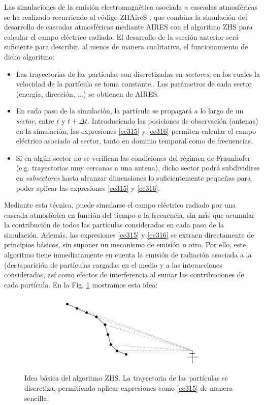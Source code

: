 \documentclass[12 pt, a4paper]{article} %
\numberwithin{equation}{section}
\numberwithin{figure}{section}
\numberwithin{table}{section}
\begin{document}
Las simulaciones de la emisión electromagnética asociada a cascadas atmosféricas se ha realizado recurriendo al código ZHAireS \cite{AlvarezMuniz2012}, que combina la simulación del desarrollo de cascadas atmosféricas mediante AIRES con el algoritmo ZHS para calcular el campo eléctrico radiado. El desarrollo de la sección anterior será suficiente para describir, al menos de manera cualitativa, el funcionamiento de dicho algoritmo:
	\begin{itemize}
		\item Las trayectorias de las partículas son discretizadas en \textit{sectores}, en los cuales la velocidad de la partícula se toma constante.. Los parámetros de cada sector (energía, dirección, ...) se obtienen de AIRES.
		\item En cada paso de la simulación, la partícula se propagará a lo largo de un \textit{sector}, entre $t$ y $t+\Delta t$. Introduciendo las posiciones de observación (antenas) en la simulación, las expresiones \eqref{ec315} y \eqref{ec316} permiten calcular el campo eléctrico asociado al sector, tanto en dominio temporal como de frecuencias.
		\item Si en algún sector no se verifican las condiciones del régimen de Fraunhofer (e.g. trayectorias muy cercanas a una antena), dicho sector podrá subdividirse en \textit{subsectores} hasta alcanzar dimensiones lo suficientemente pequeñas para poder aplicar las expresiones \eqref{ec315} y \eqref{ec316}.

		
	\end{itemize}
Mediante esta técnica, puede simularse el campo eléctrico radiado por una cascada atmosférica en función del tiempo o la frecuencia, sin más que acumular la contribución de todos las partículas consideradas en cada paso de la simulación. Además, las expresiones \eqref{ec315} y \eqref{ec316} se extraen directamente de principios básicos, sin suponer un mecanismo de emisión u otro. Por ello, este algoritmo tiene inmediatamente en cuenta la emisión de radiación asociada a la (des)aparición de partículas cargadas en el medio y a las interacciones consideradas, así como efectos de interferencia al sumar las contribuciones de cada partícula. En la Fig. \ref{ZHSsketch} mostramos esta idea:  
	\begin{figure}[H]
		\centering
		\includegraphics[width=.8\linewidth]{figures/ZHSsketch}
		\caption{Idea básica del algoritmo ZHS. La trayectoria de las partículas se discretiza, permitiendo aplicar expresiones como \eqref{ec315} de manera sencilla.}
		\label{ZHSsketch}
	\end{figure}
 
\end{document}
